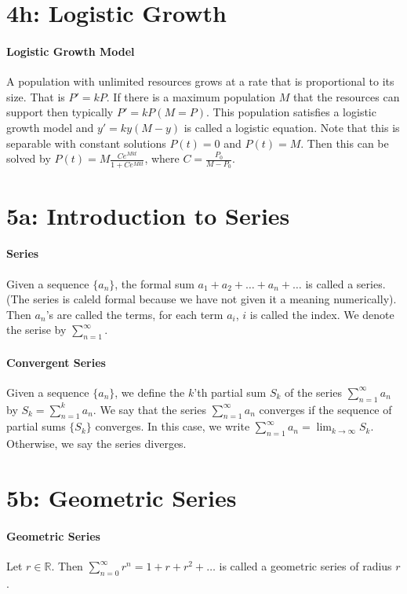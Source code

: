 \documentclass[10pt,letter]{article}
\begin{document}
\section*{4h: Logistic Growth}
\paragraph{Logistic Growth Model}
A population with unlimited resources grows at a rate that is proportional to its size. That is $P'=kP$. If there is a maximum population $M$ that the resources can support then typically $P'=kP(M=P)$. This population satisfies a logistic growth model and $y'=ky(M-y)$ is called a logistic equation. Note that this is separable with constant solutions $P(t)=0$ and $P(t)=M$. Then this can be solved by $P(t)=M\frac{Ce^{Mkt}}{1+Ce^{Mkt}}$, where $C=\frac{P_0}{M-P_0}$. 


\section*{5a: Introduction to Series}
\paragraph{Series}
Given a sequence $\{a_n\}$, the formal sum $a_1+a_2+\ldots+a_n+\ldots$ is called a series. (The series is caleld formal because we have not given it a meaning numerically). Then $a_n$'s are called the terms, for each term $a_i$, $i$ is called the index. We denote the serise by $\sum_{n=1}^\infty$. 
\paragraph{Convergent Series}
Given a sequence $\{a_n\}$, we define the $k$'th partial sum $S_k$ of the series $\sum_{n=1}^\infty a_n$ by $S_k=\sum_{n=1}^k a_n$. We say that the series $\sum_{n=1}^\infty a_n$ converges if the sequence of partial sums $\{S_k\}$ converges. In this case, we write $\sum_{n=1}^\infty a_n=\lim_{k\rightarrow\infty}S_k$. Otherwise, we say the series diverges. 

\section*{5b: Geometric Series}
\paragraph{Geometric Series}
Let $r\in\mathbb{R}$. Then $\sum_{n=0}^\infty r^n=1+r+r^2+\ldots$ is called a geometric series of radius $r$.
\end{document}
